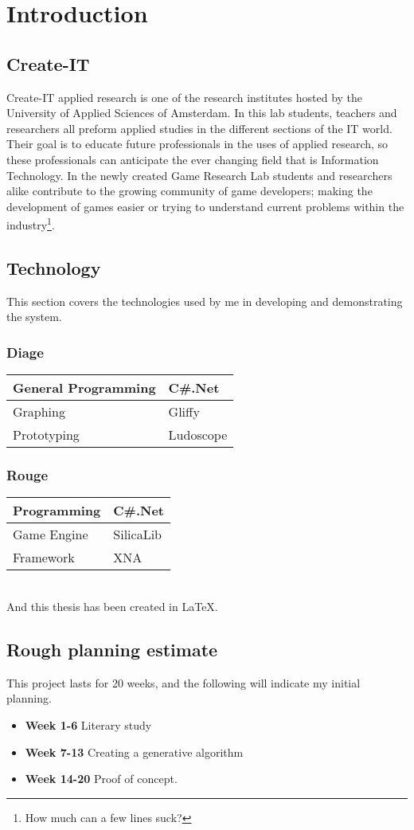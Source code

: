 
\chapter{Introduction}

\section{Create-IT}
Create-IT applied research is one of the research institutes hosted by the University of Applied Sciences of Amsterdam. In this lab students, teachers and researchers all preform applied studies in the different sections of the IT world. Their goal is to educate future professionals in the uses of applied research, so these professionals can anticipate the ever changing field that is Information Technology.
In the newly created Game Research Lab students and researchers alike contribute to the growing community of game developers; making the development of games easier or trying to understand current problems within the industry\footnote{How much can a few lines suck?}.

\section{Technology}
This section covers the technologies used by me in developing and demonstrating the \diage system.

\subsection{Diage}
\begin{tabular}{|l|l|}
	\hline
	General Programming & C\#.Net \\
	\hline
	Graphing & Gliffy\\
	\hline
	Prototyping & Ludoscope\\
	\hline
\end{tabular}
\subsection{Rouge}
	\begin{tabular}{|l|l|}
		\hline
		Programming & C\#.Net\\
		\hline
		Game Engine & SilicaLib\\
		\hline
		Framework & XNA\\
		\hline
	\end{tabular}
\\
And this thesis has been created in LaTeX.
\section{Rough planning estimate}
This project lasts for 20 weeks, and the following will indicate my initial planning.

\begin{itemize}
	\item \textbf{Week 1-6} Literary study
	\item \textbf{Week 7-13} Creating a generative algorithm
	\item \textbf{Week 14-20} Proof of concept. 
\end{itemize}
